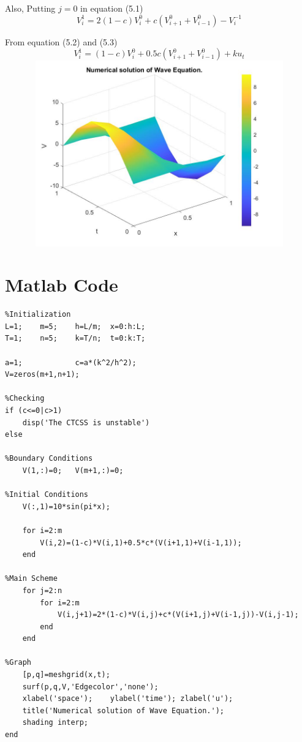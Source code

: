 Also, Putting \(j=0\) in equation (5.1)
\begin{equation}
  V_i^1= 2(1-c)V_i^0 +c(V_{i+1}^0+V_{i-1}^0)  - V_i^{-1}
\end{equation}

From equation (5.2) and (5.3)
\begin{equation}
    V_i^1 = (1-c)V_i^0 +0.5c(V_{i+1}^0+V_{i-1}^0)  +ku_t
  \end{equation}
  \vspace{5mm}
  \includegraphics[width=15cm, height=8cm]{wave.jpg}

\clearpage
\section{Matlab Code}
\begin{verbatim}
%Initialization
L=1;	m=5;	h=L/m;	x=0:h:L;
T=1;	n=5;	k=T/n;	t=0:k:T;

a=1;			c=a*(k^2/h^2);
V=zeros(m+1,n+1);

%Checking
if (c<=0|c>1)
    disp('The CTCSS is unstable')
else

%Boundary Conditions
    V(1,:)=0;	V(m+1,:)=0;

%Initial Conditions
    V(:,1)=10*sin(pi*x);

    for i=2:m
        V(i,2)=(1-c)*V(i,1)+0.5*c*(V(i+1,1)+V(i-1,1));
    end

%Main Scheme
    for j=2:n
        for i=2:m
            V(i,j+1)=2*(1-c)*V(i,j)+c*(V(i+1,j)+V(i-1,j))-V(i,j-1);
        end
    end

%Graph
    [p,q]=meshgrid(x,t);
    surf(p,q,V,'Edgecolor','none');
    xlabel('space');	ylabel('time');	zlabel('u');
    title('Numerical solution of Wave Equation.');
    shading interp;
end
\end{verbatim}
